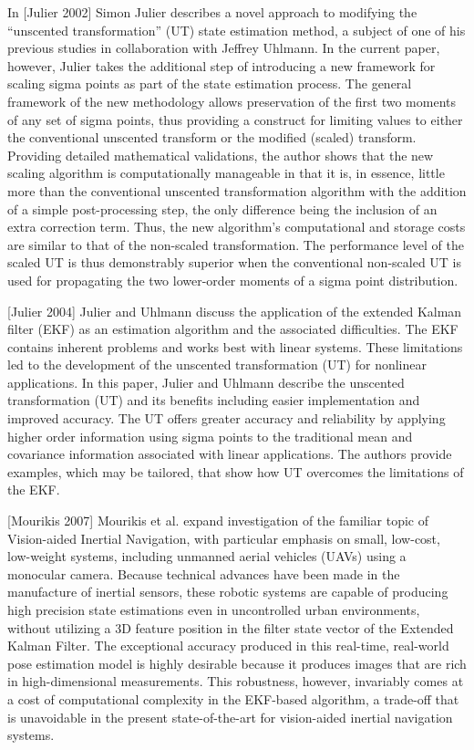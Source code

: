 In [Julier 2002] Simon Julier describes a novel approach to modifying the “unscented transformation” (UT) state estimation method, a subject of one of his previous studies in collaboration with Jeffrey Uhlmann. In the current paper, however, Julier takes the additional step of introducing a new framework for scaling sigma points as part of the state estimation process. The general framework of the new methodology allows preservation of the first two moments of any set of sigma points, thus providing a construct for limiting values to either the conventional unscented transform or the modified (scaled) transform. Providing detailed mathematical validations, the author shows that the new scaling algorithm is computationally manageable in that it is, in essence, little more than the conventional unscented transformation algorithm with the addition of a simple post-processing step, the only difference being the inclusion of an extra correction term. Thus, the new algorithm's computational and storage costs are similar to that of the non-scaled transformation. The performance level of the scaled UT is thus demonstrably superior when the conventional non-scaled UT is used for propagating the two lower-order moments of a sigma point distribution.

[Julier 2004] Julier and Uhlmann discuss the application of the extended Kalman filter (EKF) as an estimation algorithm and the associated difficulties. The EKF contains inherent problems and works best with linear systems. These limitations led to the development of the unscented transformation (UT) for nonlinear applications. In this paper, Julier and Uhlmann describe the unscented transformation (UT) and its benefits including easier implementation and improved accuracy. The UT offers greater accuracy and reliability by applying higher order information using sigma points to the traditional mean and covariance information associated with linear applications. The authors provide examples, which may be tailored, that show how UT overcomes the limitations of the EKF.

[Mourikis 2007] Mourikis et al. expand investigation of the familiar topic of Vision-aided Inertial Navigation, with particular emphasis on small, low-cost, low-weight systems, including unmanned aerial vehicles (UAVs) using a monocular camera. Because technical advances have been made in the manufacture of inertial sensors, these robotic systems are capable of producing high precision state estimations even in uncontrolled urban environments, without utilizing a 3D feature position in the filter state vector of the Extended Kalman Filter. The exceptional accuracy produced in this real-time, real-world pose estimation model is highly desirable because it produces images that are rich in high-dimensional measurements. This robustness, however, invariably comes at a cost of computational complexity in the EKF-based algorithm, a trade-off that is unavoidable in the present state-of-the-art for vision-aided inertial navigation systems.

